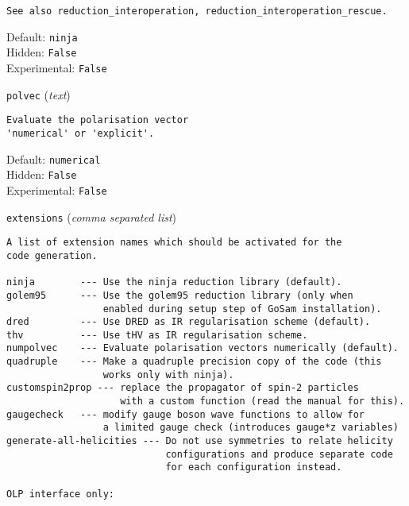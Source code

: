 \begin{basedescript}{\desclabelstyle{\pushlabel}}
\begin{verbatim}
See also reduction_interoperation, reduction_interoperation_rescue.
\end{verbatim}
Default: \verb|ninja|
\\Hidden: \verb|False|
\\Experimental: \verb|False|
\\\item[\colorbox{gray!30}{\texttt{polvec}}] (\textit{text})
\begin{verbatim}
Evaluate the polarisation vector
'numerical' or 'explicit'.
\end{verbatim}
Default: \verb|numerical|
\\Hidden: \verb|False|
\\Experimental: \verb|False|
\\\item[\colorbox{gray!30}{\texttt{extensions}}] (\textit{comma separated list})
\begin{verbatim}
A list of extension names which should be activated for the
code generation.

ninja        --- Use the ninja reduction library (default).
golem95      --- Use the golem95 reduction library (only when
                 enabled during setup step of GoSam installation).
dred         --- Use DRED as IR regularisation scheme (default).
thv          --- Use tHV as IR regularisation scheme.
numpolvec    --- Evaluate polarisation vectors numerically (default).
quadruple    --- Make a quadruple precision copy of the code (this
                 works only with ninja).
customspin2prop --- replace the propagator of spin-2 particles
                    with a custom function (read the manual for this).
gaugecheck   --- modify gauge boson wave functions to allow for
                 a limited gauge check (introduces gauge*z variables)
generate-all-helicities --- Do not use symmetries to relate helicity
                            configurations and produce separate code
                            for each configuration instead.

OLP interface only:


\end{verbatim}
\end{basedescript}
